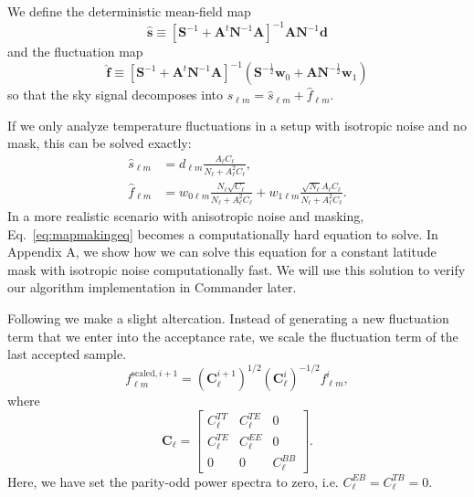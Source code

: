 \documentclass[twocolumn]{../common/aa}
\begin{document}
We define the deterministic mean-field map
\begin{equation}
\hat{\textbf{s}} \equiv \left[\mathbf{S}^{-1} + \mathbf{A}^t \mathbf{N}^{-1}\mathbf{A} \right]^{-1} \mathbf{A} \mathbf{N}^{-1} \mathbf{d}
\end{equation}
and the fluctuation map
\begin{equation}
\hat{\textbf{f}} \equiv \left[\mathbf{S}^{-1} + \mathbf{A}^t \mathbf{N}^{-1}\mathbf{A} \right]^{-1} \left(\mathbf{S}^{-\frac{1}{2}}\mathbf{w}_0 +\mathbf{A N}^{-\frac{1}{2}}\mathbf{w}_1 \right)
\end{equation}
so that the sky signal decomposes into $s_{\ell m} = \hat{s}_{\ell m} + \hat{f}_{\ell m}$.

If we only analyze temperature fluctuations in a setup with isotropic noise and no mask, this can be solved exactly:
\begin{align}
    \hat{s}_{\ell m} &= d_{\ell m}\frac{A_{\ell}C_{\ell}}{N_\ell + A_{\ell}^2C_{\ell}},\\
    \hat{f}_{\ell m} &= w_{0\ell m}\frac{N_{\ell}\sqrt{C_{\ell}}}{N_\ell + A_{\ell}^2C_{\ell}}+w_{1\ell m}\frac{\sqrt{N_{\ell}}A_{\ell}C_\ell}{N_\ell + A_{\ell}^2C_{\ell}}.
\end{align}
In a more realistic scenario with anisotropic noise and masking, Eq.~\eqref{eq:mapmakingeq} becomes a computationally hard equation to solve. In Appendix A, we show how we can solve this equation for a constant latitude mask with isotropic noise computationally fast. We will use this solution to verify our algorithm implementation in Commander later.

Following \cite{racine:2016} we make a slight altercation. Instead of generating a new fluctuation term that we enter into the acceptance rate, we scale the fluctuation term of the last accepted sample.
\begin{equation}
    f_{\ell m}^{\textrm{scaled}, i+1} = \left(\textbf{C}^{i+1}_{\ell}\right)^{1/2}\left(\textbf{C}^{i}_{\ell}\right)^{-1/2} f_{\ell m}^{i},
\end{equation}
where
\begin{equation}
\textbf{C}_{\ell} = \begin{bmatrix}
C^{TT}_\ell & C^{TE}_\ell & 0\\
C^{TE}_\ell & C^{EE}_\ell & 0\\
0 & 0 & C^{BB}_\ell
\end{bmatrix}.
\end{equation}
Here, we have set the parity-odd power spectra to zero, i.e. $C^{EB}_\ell =C^{TB}_\ell = 0$.
\end{document}
